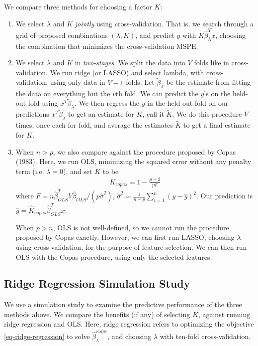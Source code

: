 \documentclass[main]{subfiles}
\begin{document}
We compare three methods for choosing a factor $K$:
\begin{enumerate}
	\item We select $\lambda$ and $K$ {\itshape jointly} using cross-validation. That is, we search through
	a grid of proposed combinations $(\lambda, K)$, and predict $y$ with $K \hat\beta_\lambda^T x$,
	choosing the combination that minimizes the cross-validation MSPE.
	\item We select $\lambda$ and $K$ in {\itshape two-stages}. We split the data into $V$ folds
	like in cross-validation. We run ridge (or LASSO) and select lambda, with cross-validation,
	using only data in $V - 1$ folds. Let $\tilde\beta_\lambda$ be the estimate from fitting the data on everything
	but the $v$th fold. We can predict the $y$'s on the held-out fold using $x^T \tilde\beta_\lambda$.
	We then regress the $y$ in the
	held out fold on our predictions $x^T \tilde\beta_\lambda$ to get an estimate for $K$, call it $\tilde K$.
	We do this procedure $V$ times, once each for fold,
	and average the estimates $\tilde K$ to get a final estimate for $K$.
	\item When $n > p$, we also compare against the procedure proposed by Copas (1983). Here,
	we run OLS, minimizing the squared error without any penalty term (i.e. $\lambda = 0$), and set $K$ to be
	\begin{align}
	  K_{copas} = 1 - \frac{p - 2}{pF}\label{eq:Copas_K}
	\end{align}
	where $F = n \hat\beta_{OLS}^T V \hat\beta_{OLS} / (p \hat\sigma^2)$,
	$\hat\sigma^2 = \frac{1}{n - p}\sum_{i=1}^n (y - \hat y)^2$.
	Our prediction is $\hat y = \hat K_{copas}  \hat\beta_{OLS}^T x$.

	When $p > n$, OLS is not well-defined, so we cannot run the procedure proposed by Copas exactly.
	However, we can first run LASSO, choosing $\lambda$ using cross-validation,
	for the purpose of feature selection. We can then run OLS with the Copas procedure, using
	only the selected features.
\end{enumerate}

\subsection{Ridge Regression Simulation Study}
We use a simulation study to examine the predictive performance of the three methods above. We compare
the benefits (if any) of selecting $K$, against running ridge regression and OLS. Here, ridge regression
refers to optimizing the objective \eqref{eq-ridge-regression} to solve $\hat\beta^{ridge}_\lambda$, and choosing
$\lambda$ with ten-fold cross-validation.
\end{document}
